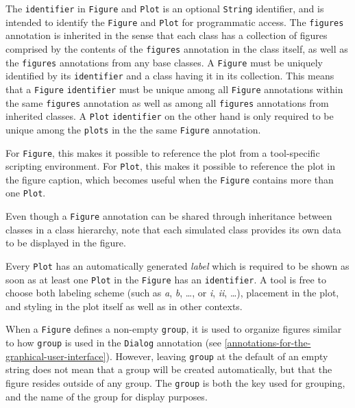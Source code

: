 The \lstinline!identifier! in \lstinline!Figure! and \lstinline!Plot! is an optional \lstinline!String! identifier, and is intended to identify the
\lstinline!Figure! and \lstinline!Plot! for programmatic access.  The \lstinline!figures! annotation is inherited in the sense that each class has
a collection of figures comprised by the contents of the \lstinline!figures! annotation in the class itself, as well as the \lstinline!figures! annotations
from any base classes.  A \lstinline!Figure! must be uniquely identified by its \lstinline!identifier! and a class having it in its collection.  This
means that a \lstinline!Figure! \lstinline!identifier! must be unique among all \lstinline!Figure! annotations within the same \lstinline!figures!
annotation as well as among all \lstinline!figures! annotations from inherited classes.  A \lstinline!Plot! \lstinline!identifier! on the other hand
is only required to be unique among the \lstinline!plots! in the the same \lstinline!Figure! annotation.

\begin{nonnormative}
For \lstinline!Figure!, this makes it possible to reference the plot from a
tool-specific scripting environment. For \lstinline!Plot!, this makes it
possible to reference the plot in the figure caption, which becomes useful when
the \lstinline!Figure! contains more than one \lstinline!Plot!.
\end{nonnormative}

Even though a \lstinline!Figure! annotation can be shared through inheritance between classes in a class hierarchy, note that each simulated class provides
its own data to be displayed in the figure.

Every \lstinline!Plot! has an automatically generated \emph{label} which is
required to be shown as soon as at least one \lstinline!Plot! in the
\lstinline!Figure! has an \lstinline!identifier!.  A tool is free to choose both
labeling scheme (such as \emph{a}, \emph{b}, \dots, or \emph{i}, \emph{ii}, \dots), placement in the plot,
and styling in the plot itself as well as in other contexts.

When a \lstinline!Figure! defines a non-empty \lstinline!group!, it is used to
organize figures similar to how \lstinline!group! is used in the
\lstinline!Dialog! annotation (see \cref{annotations-for-the-graphical-user-interface}).  However, leaving \lstinline!group! at
the default of an empty string does not mean that a group will be created
automatically, but that the figure resides outside of any group. The
\lstinline!group! is both the key used for grouping, and the name of the group
for display purposes.

